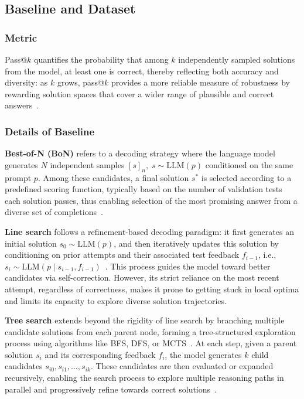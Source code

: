 \documentclass[11pt]{article}
\theoremstyle{definition}
\theoremstyle{remark}
\begin{document}
\subsection{Baseline and Dataset}
\subsubsection{Metric}
Pass@$k$ quantifies the probability that among $k$ independently sampled solutions from the model, at least one is correct, thereby reflecting both accuracy and diversity: as $k$ grows, pass@$k$ provides a more reliable measure of robustness by rewarding solution spaces that cover a wider range of plausible and correct answers~\citep{chen2021evaluating}.




\subsubsection{Details of Baseline}
\textbf{Best-of-N (BoN)} refers to a decoding strategy where the language model generates $N$ independent samples $[s]_n,\; s \sim \mathrm{LLM}(p)$ conditioned on the same prompt $p$. Among these candidates, a final solution $s^*$ is selected according to a predefined scoring function, typically based on the number of validation tests each solution passes, thus enabling selection of the most promising answer from a diverse set of completions~\citep{li2022competition, chen2024alphamath}. 

\textbf{Line search} follows a refinement-based decoding paradigm: it first generates an initial solution $s_0 \sim \mathrm{LLM}(p)$, and then iteratively updates this solution by conditioning on prior attempts and their associated test feedback $f_{i-1}$, i.e., $s_i \sim \mathrm{LLM}(p\mid s_{i-1}, f_{i-1})$~\citep{shinn2023reflexion, madaan2023selfrefine}. This process guides the model toward better candidates via self-correction. However, its strict reliance on the most recent attempt, regardless of correctness, makes it prone to getting stuck in local optima and limits its capacity to explore diverse solution trajectories.


\textbf{Tree search} extends beyond the rigidity of line search by branching multiple candidate solutions from each parent node, forming a tree-structured exploration process using algorithms like BFS, DFS, or MCTS~\citep{zhou2024language, yao2023tree, wan2024alphazerolike, tian2024toward}. At each step, given a parent solution $s_i$ and its corresponding feedback $f_i$, the model generates $k$ child candidates $s_{i0}, s_{i1}, \dots, s_{ik}$. These candidates are then evaluated or expanded recursively, enabling the search process to explore multiple reasoning paths in parallel and progressively refine towards correct solutions~\citep{light2025strategist}.
\end{document}

